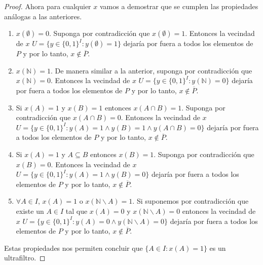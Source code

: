 \documentclass[letter,twoside,12pt]{article}
\begin{document}
\begin{enumerate}
\begin{proof}
Ahora para cualquier $ x $ vamos a demostrar que se cumplen las propiedades análogas a las anteriores. 

\begin{enumerate}
\item $ x(\emptyset)=0. $ Suponga por contradicción que $ x(\emptyset) = 1 $. Entonces la vecindad de $ x $ $U = \{y \in \{0,1\}^I : y(\emptyset)=1 \} $ dejaría por fuera a todos los elementos de $ P $ y por lo tanto, $ x \not \in \overline{P} $.

\item $ x(\mathbb{N})=1 $. De manera similar a la anterior, suponga por contradicción que $ x(\mathbb{N}) = 0 $. Entonces la vecindad de $ x $ $U = \{y \in \{0,1\}^I : y(\mathbb{N})=0 \} $ dejaría por fuera a todos los elementos de $ P $ y por lo tanto, $ x \not \in \overline{P} $.

\item Si $ x(A)=1 $ y $ x(B)=1 $ entonces $ x(A \cap B) = 1 $. Suponga por contradicción que $ x(A \cap B ) = 0 $. Entonces la vecindad de $ x $ $U = \{y \in \{0,1\}^I : y(A)= 1 \wedge y(B)=1 \wedge y(A\cap B)= 0\} $ dejaría por fuera a todos los elementos de $ P $ y por lo tanto, $ x \not \in \overline{P} $.

\item Si $ x(A)=1 $ y $ A \subseteq B $ entonces $ x(B)=1 $. Suponga por contradicción que $ x(B) = 0 $. Entonces la vecindad de $ x $ $U = \{y \in \{0,1\}^I : y(A)= 1 \wedge y(B)=0 \} $ dejaría por fuera a todos los elementos de $ P $ y por lo tanto, $ x \not \in \overline{P} $.

\item $ \forall A \in I $, $ x(A)=1 $ o $ x(\mathbb{N}\backslash A) = 1 $. Si suponemos por contradicción que existe un $ A \in I $ tal que $ x(A) = 0 $ y $ x(\mathbb{N}\backslash A)= 0 $ entonces la vecindad de $ x $ $U = \{y \in \{0,1\}^I : y(A)= 0 \wedge y(\mathbb{N}\backslash A)=0 \} $ dejaría por fuera a todos los elementos de $ P $ y por lo tanto, $ x \not \in \overline{P} $.
\end{enumerate}

Estas propiedades nos permiten concluir que $ \{A \in I: x(A)=1\} $ es un ultrafiltro.


\end{proof}
\end{enumerate}
\end{document}
